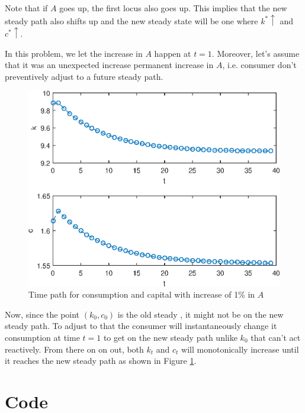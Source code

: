 \documentclass[12pt]{article}
\newcommand{\1}{{\bf 1}} %
\begin{document}
\begin{enumerate}[(1)]
		Note that if $A$ goes up, the first locus also goes up. This implies that the new steady path also shifts up and the new steady state will be one where $k^*\uparrow$ and $c^*\uparrow$. 
		
		In this problem, we let the increase in $A$ happen at $t=1$. Moreover, let's assume that it was an unexpected increase permanent increase in $A$, i.e. consumer don't preventively adjust to a future steady path.
						\begin{figure}[H]
			\centering
			\includegraphics[width=0.7\linewidth]{fig4}
			\caption{Time path for consumption and capital with increase of 1\% in $A$}
			\label{fig:fig4}
		\end{figure}
		
		Now, since the point $(k_0,c_0)$ is the old steady , it might not be on the new steady path. To adjust to that the consumer will instantaneously change it consumption at time $t=1$ to get on the new steady path unlike $k_0$ that can't act reactively. From there on on out, both $k_t$ and $c_t$ will monotonically increase until it reaches the new steady path as shown in Figure \ref{fig:fig4}. 
	\end{enumerate}

\section*{Code}


\end{document}
